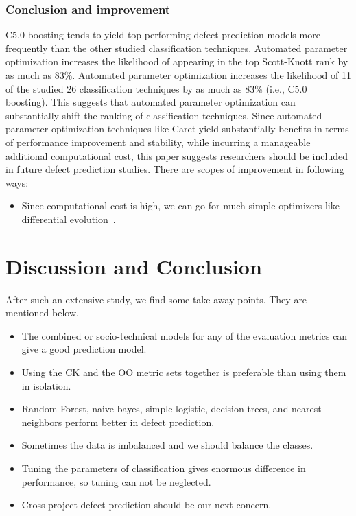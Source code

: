 \documentclass[conference]{IEEEtran}
\begin{document}
\subsubsection{\textbf{Conclusion and improvement}}
C5.0 boosting tends to yield top-performing defect prediction models more frequently than the other studied classification techniques. Automated parameter optimization increases the likelihood of appearing in the top Scott-Knott rank by as much as 83\%. Automated parameter optimization increases the likelihood of 11 of the studied 26 classification techniques by as much as 83\% (i.e., C5.0 boosting). This suggests that automated parameter optimization can substantially shift the ranking of classification techniques. Since automated parameter optimization techniques like Caret yield substantially benefits in terms of performance improvement and stability, while incurring a manageable additional computational cost, this paper suggests researchers should be included in future defect prediction studies.
There are scopes of improvement in following ways:
\begin{itemize}
    \item Since computational cost is high, we can go for much simple optimizers like differential evolution~\cite{storn1997differential}.
\end{itemize}

\section{Discussion and Conclusion}
\label{conclusion}
After such an extensive study, we find some take away points. They are mentioned below.
\begin{itemize}
    \item The combined or socio-technical models for any of the evaluation metrics can give a good prediction model.
    \item Using the CK and the OO metric sets together is preferable than using them in isolation.
    \item Random Forest, naive bayes, simple logistic, decision trees, and nearest neighbors perform better in defect prediction.
    \item Sometimes the data is imbalanced and we should balance the classes.
    \item Tuning the parameters of classification gives enormous difference in performance, so tuning can not be neglected.
    \item Cross project defect prediction should be our next concern.
\end{itemize}

\ifCLASSOPTIONcaptionsoff
  \newpage
\fi

\balance


\medskip

\end{document}
